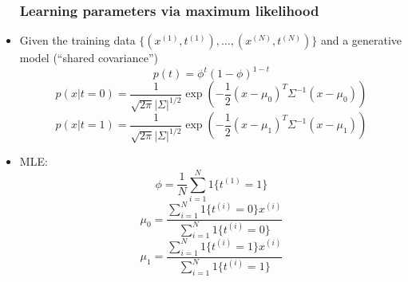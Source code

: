 \begin{itemize}
		\subsubsection{Learning parameters via maximum likelihood}
		\item Given the training data $\{(x^{(1)}, t^{(1)}), \ldots, (x^{(N)}, t^{(N)}) \}$ and a generative model (``shared covariance'')
			$$p(t)=\phi^t (1-\phi)^{1-t}$$
			$$p(x|t=0)=\frac{1}{\sqrt{2\pi}|\Sigma|^{1/2}}\exp(-\frac{1}{2}(x-\mu_0)^T\Sigma^{-1}(x-\mu_0))$$
			$$p(x|t=1)=\frac{1}{\sqrt{2\pi}|\Sigma|^{1/2}}\exp(-\frac{1}{2}(x-\mu_1)^T\Sigma^{-1}(x-\mu_1))$$
		\item MLE:
			$$\phi=\frac{1}{N}\sum_{i=1}^N 1\{ t^{(1)}=1\}$$
			$$\mu_0=\frac{\sum_{i=1}^N 1\{ t^{(i)}=0\}x^{(i)}}{\sum_{i=1}^N 1\{ t^{(i)} = 0\}}$$
			$$\mu_1=\frac{\sum_{i=1}^N 1\{ t^{(i)}=1\}x^{(i)}}{\sum_{i=1}^N 1\{ t^{(i)} = 1\}}$$
\end{itemize}

